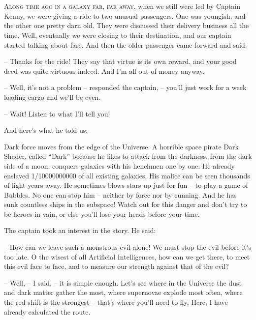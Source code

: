 \documentclass[ebook,oneside,final,openright]{memoir}
\begin{document}
\chapter{}
\par
\lettrine{A}{long time ago in a galaxy far, far away,} when we still were led by Captain Kenny, we were giving a ride to two unusual passengers. One was youngish, and the other one pretty darn old. They were discussed their delivery business all the time. Well, eventually we were closing to their destination, and our captain started talking about fare. And then the older passenger came forward and said: \par
\par
– Thanks for the ride! They say that virtue is its own reward, and your good deed was quite virtuous indeed. And I’m all out of money anyway.\par
– Well, it’s not a problem – responded the captain, – you’ll just work for a week loading cargo and we’ll be even. \par
– Wait! Listen to what I’ll tell you! \par
 And here’s what he told us:\par
\par
Dark force moves from the edge of the Universe. A horrible space pirate Dark Shader, called “Dark” because he likes to attack from the darkness, from the dark side of a moon, conquers galaxies with his henchmen one by one. He already enslaved 1/10000000000 of all existing galaxies. His malice can be seen thousands of light years away. He sometimes blows stars up just for fun – to play a game of Bubbles. No one can stop him – neither by force nor by cunning. And he has sunk countless ships in the subspace! Watch out for this danger and don’t try to be heroes in vain, or else you’ll lose your heads before your time.\par
\par
The captain took an interest in the story. He said:\par
– How can we leave such a monstrous evil alone! We must stop the evil before it’s too late. O the wisest of all Artificial Intelligences, how can we get there, to meet this evil face to face, and to measure our strength against that of the evil?\par
– Well, – I said, – it is simple enough. Let’s see where in the Universe the dust and dark matter gather the most, where supernovae explode most often, where the red shift is the strongest – that’s where you’ll need to fly. Here, I have already calculated the route.\par
\end{document}
